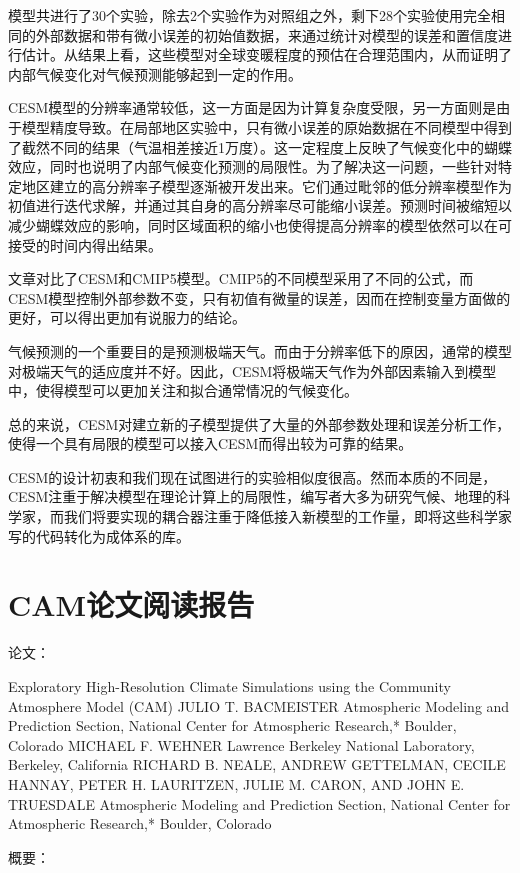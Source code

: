 模型共进行了30个实验，除去2个实验作为对照组之外，剩下28个实验使用完全相同的外部数据和带有微小误差的初始值数据，来通过统计对模型的误差和置信度进行估计。从结果上看，这些模型对全球变暖程度的预估在合理范围内，从而证明了内部气候变化对气候预测能够起到一定的作用。

CESM模型的分辨率通常较低，这一方面是因为计算复杂度受限，另一方面则是由于模型精度导致。在局部地区实验中，只有微小误差的原始数据在不同模型中得到了截然不同的结果（气温相差接近1万度）。这一定程度上反映了气候变化中的蝴蝶效应，同时也说明了内部气候变化预测的局限性。为了解决这一问题，一些针对特定地区建立的高分辨率子模型逐渐被开发出来。它们通过毗邻的低分辨率模型作为初值进行迭代求解，并通过其自身的高分辨率尽可能缩小误差。预测时间被缩短以减少蝴蝶效应的影响，同时区域面积的缩小也使得提高分辨率的模型依然可以在可接受的时间内得出结果。

文章对比了CESM和CMIP5模型。CMIP5的不同模型采用了不同的公式，而CESM模型控制外部参数不变，只有初值有微量的误差，因而在控制变量方面做的更好，可以得出更加有说服力的结论。


气候预测的一个重要目的是预测极端天气。而由于分辨率低下的原因，通常的模型对极端天气的适应度并不好。因此，CESM将极端天气作为外部因素输入到模型中，使得模型可以更加关注和拟合通常情况的气候变化。

总的来说，CESM对建立新的子模型提供了大量的外部参数处理和误差分析工作，使得一个具有局限的模型可以接入CESM而得出较为可靠的结果。

CESM的设计初衷和我们现在试图进行的实验相似度很高。然而本质的不同是，CESM注重于解决模型在理论计算上的局限性，编写者大多为研究气候、地理的科学家，而我们将要实现的耦合器注重于降低接入新模型的工作量，即将这些科学家写的代码转化为成体系的库。

\section{CAM论文阅读报告}

论文：

Exploratory High-Resolution Climate Simulations using the Community Atmosphere Model (CAM) JULIO T. BACMEISTER Atmospheric Modeling and Prediction Section, National Center for Atmospheric Research,* Boulder, Colorado MICHAEL F. WEHNER Lawrence Berkeley National Laboratory, Berkeley, California RICHARD B. NEALE, ANDREW GETTELMAN, CECILE HANNAY, PETER H. LAURITZEN, JULIE M. CARON, AND JOHN E. TRUESDALE Atmospheric Modeling and Prediction Section, National Center for Atmospheric Research,* Boulder, Colorado


概要：

